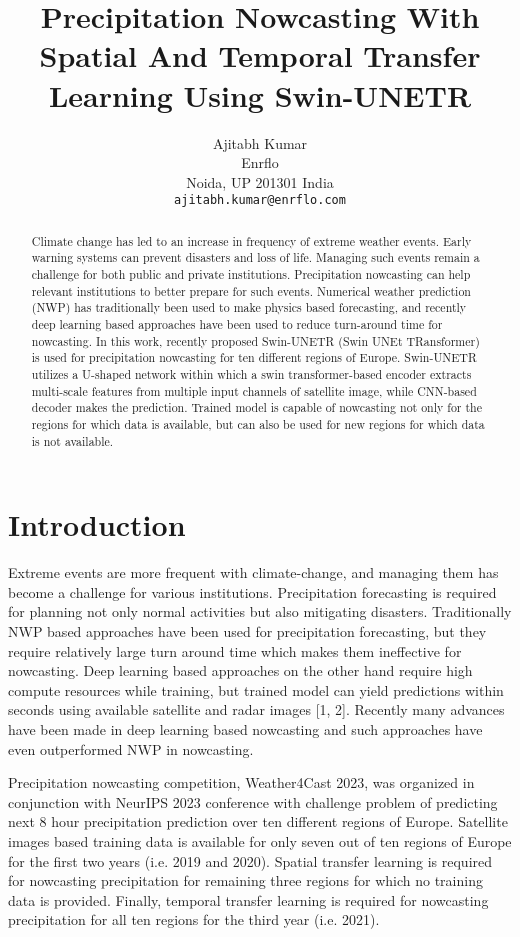 \documentclass{article}
\title{Precipitation Nowcasting With Spatial And Temporal Transfer Learning Using Swin-UNETR}
\author{%
  Ajitabh Kumar\\
  Enrflo\\
  Noida, UP 201301 India \\
  \texttt{ajitabh.kumar@enrflo.com} \\
}
\begin{document}
\maketitle


\begin{abstract}
  Climate change has led to an increase in frequency of extreme weather events. Early warning systems can prevent disasters and loss of life. Managing such events remain a challenge for both public and private institutions. Precipitation nowcasting can help relevant institutions to better prepare for such events. Numerical weather prediction (NWP) has traditionally been used to make physics based forecasting, and recently deep learning based approaches have been used to reduce turn-around time for nowcasting. In this work, recently proposed Swin-UNETR (Swin UNEt TRansformer) is used for precipitation nowcasting for ten different regions of Europe. Swin-UNETR utilizes a U-shaped network within which a swin transformer-based encoder extracts multi-scale features from multiple input channels of satellite image, while CNN-based decoder makes the prediction. Trained model is capable of nowcasting not only for the regions for which data is available, but can also be used for new regions for which data is not available.
\end{abstract}


\section{Introduction}

Extreme events are more frequent with climate-change, and managing them has become a challenge for various institutions. Precipitation forecasting is required for planning not only normal activities but also mitigating disasters. Traditionally NWP based approaches have been used for precipitation forecasting, but they require relatively large turn around time which makes them ineffective for nowcasting. Deep learning based approaches on the other hand require high compute resources while training, but trained model can yield predictions within seconds using available satellite and radar images [1, 2]. Recently many advances have been made in deep learning based nowcasting and such approaches have even outperformed NWP in nowcasting.

Precipitation nowcasting competition, Weather4Cast 2023, was organized in conjunction with NeurIPS 2023 conference with challenge problem of predicting next 8 hour precipitation prediction over ten different regions of Europe. Satellite images based training data is available for only seven out of ten regions of Europe for the first two years (i.e. 2019 and 2020). Spatial transfer learning is required for nowcasting precipitation for remaining three regions for which no training data is provided. Finally, temporal transfer learning is required for nowcasting precipitation for all ten regions for the third year (i.e. 2021).
\end{document}
